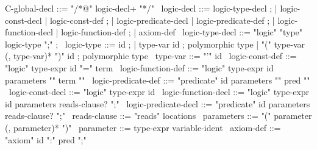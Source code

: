 \begin{syntax}
  C-global-decl ::= "/*@" logic-decl+ "*/"
  \
  logic-decl ::= logic-type-decl ;
          | logic-const-decl | logic-const-def ;
          | logic-predicate-decl | logic-predicate-def ;
          | logic-function-decl | logic-function-def ;
          | axiom-def
  \
  logic-type-decl ::= "logic" "type" logic-type ";" ; 
  \
  logic-type ::= id ;
  | type-var id ; polymorphic type
  | "(" type-var (, type-var)* ")" id ; polymorphic type
  \
  type-var ::= "'" id 
  \
  logic-const-def ::= "logic" type-expr id "=" term
  \
  logic-function-def ::= "logic" type-expr id parameters "{" term "}"
  \
  logic-predicate-def ::= "predicate" id parameters "{" pred "}"
  \
  logic-const-decl ::= "logic" type-expr id 
  \
  logic-function-decl ::= "logic" type-expr id parameters reads-clause? ";"
  \
  logic-predicate-decl ::= "predicate" id parameters reads-clause? ";"
  \
  reads-clause ::= "reads" locations
  \
  parameters ::= "(" parameter (, parameter)* ")"
  \
  parameter ::= type-expr variable-ident  
  \
  axiom-def ::= "axiom" id ":" pred ";"
\end{syntax}